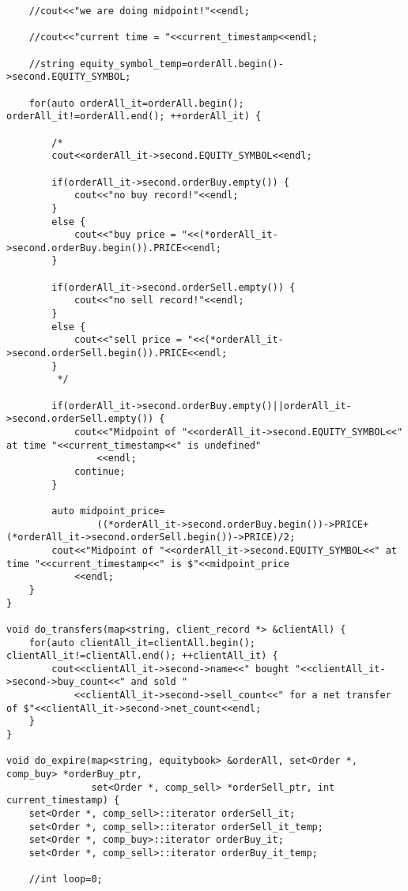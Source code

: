 \documentclass{article}
\begin{document}
\begin{spacing}{1.5}
\begin{lstlisting}
    //cout<<"we are doing midpoint!"<<endl;

    //cout<<"current time = "<<current_timestamp<<endl;

    //string equity_symbol_temp=orderAll.begin()->second.EQUITY_SYMBOL;

    for(auto orderAll_it=orderAll.begin(); orderAll_it!=orderAll.end(); ++orderAll_it) {

        /*
        cout<<orderAll_it->second.EQUITY_SYMBOL<<endl;

        if(orderAll_it->second.orderBuy.empty()) {
            cout<<"no buy record!"<<endl;
        }
        else {
            cout<<"buy price = "<<(*orderAll_it->second.orderBuy.begin()).PRICE<<endl;
        }

        if(orderAll_it->second.orderSell.empty()) {
            cout<<"no sell record!"<<endl;
        }
        else {
            cout<<"sell price = "<<(*orderAll_it->second.orderSell.begin()).PRICE<<endl;
        }
         */

        if(orderAll_it->second.orderBuy.empty()||orderAll_it->second.orderSell.empty()) {
            cout<<"Midpoint of "<<orderAll_it->second.EQUITY_SYMBOL<<" at time "<<current_timestamp<<" is undefined"
                <<endl;
            continue;
        }

        auto midpoint_price=
                ((*orderAll_it->second.orderBuy.begin())->PRICE+(*orderAll_it->second.orderSell.begin())->PRICE)/2;
        cout<<"Midpoint of "<<orderAll_it->second.EQUITY_SYMBOL<<" at time "<<current_timestamp<<" is $"<<midpoint_price
            <<endl;
    }
}

void do_transfers(map<string, client_record *> &clientAll) {
    for(auto clientAll_it=clientAll.begin(); clientAll_it!=clientAll.end(); ++clientAll_it) {
        cout<<clientAll_it->second->name<<" bought "<<clientAll_it->second->buy_count<<" and sold "
            <<clientAll_it->second->sell_count<<" for a net transfer of $"<<clientAll_it->second->net_count<<endl;
    }
}

void do_expire(map<string, equitybook> &orderAll, set<Order *, comp_buy> *orderBuy_ptr,
               set<Order *, comp_sell> *orderSell_ptr, int current_timestamp) {
    set<Order *, comp_sell>::iterator orderSell_it;
    set<Order *, comp_sell>::iterator orderSell_it_temp;
    set<Order *, comp_buy>::iterator orderBuy_it;
    set<Order *, comp_sell>::iterator orderBuy_it_temp;

    //int loop=0;


\end{lstlisting}
\end{spacing}
\end{document}
